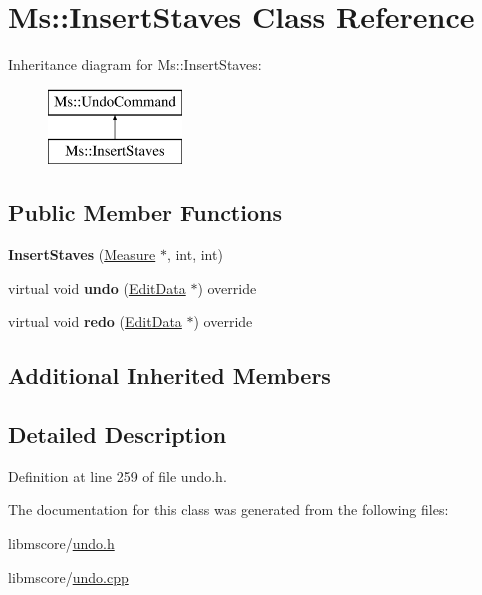\hypertarget{class_ms_1_1_insert_staves}{}\section{Ms\+:\+:Insert\+Staves Class Reference}
\label{class_ms_1_1_insert_staves}
Inheritance diagram for Ms\+:\+:Insert\+Staves\+:\begin{figure}[H]
\begin{center}
\leavevmode
\includegraphics[height=2.000000cm]{class_ms_1_1_insert_staves}
\end{center}
\end{figure}
\subsection*{Public Member Functions}
\begin{DoxyCompactItemize}
\item 
\mbox{\label{class_ms_1_1_insert_staves_a0f39a8bf9bd9c586aff88896b4ad6a3f}} 
{\bfseries Insert\+Staves} (\hyperlink{class_ms_1_1_measure}{Measure} $\ast$, int, int)
\item 
\mbox{\label{class_ms_1_1_insert_staves_a0ffe96f50437928b17c6d3b2f23c933e}} 
virtual void {\bfseries undo} (\hyperlink{class_ms_1_1_edit_data}{Edit\+Data} $\ast$) override
\item 
\mbox{\label{class_ms_1_1_insert_staves_afbd1d3ae44edf1c90f74f5af25d69d7e}} 
virtual void {\bfseries redo} (\hyperlink{class_ms_1_1_edit_data}{Edit\+Data} $\ast$) override
\end{DoxyCompactItemize}
\subsection*{Additional Inherited Members}


\subsection{Detailed Description}


Definition at line 259 of file undo.\+h.



The documentation for this class was generated from the following files\+:\begin{DoxyCompactItemize}
\item 
libmscore/\hyperlink{undo_8h}{undo.\+h}\item 
libmscore/\hyperlink{undo_8cpp}{undo.\+cpp}\end{DoxyCompactItemize}
